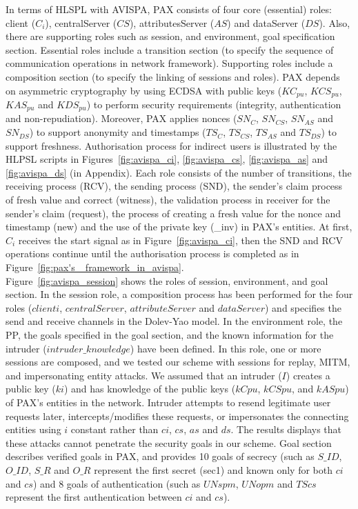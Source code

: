 \documentclass[journal,article,submit,moreauthors,pdftex]{Definitions/mdpi}
\begin{document}
\begin{itemize}
In terms of HLSPL with AVISPA, PAX consists of four core (essential) roles: client ($C_i$), centralServer ($CS$), attributesServer ($AS$) and dataServer ($DS$). Also, there are supporting roles such as session, and environment, goal specification section. Essential roles include a transition section (to specify the sequence of communication operations in network framework). Supporting roles include a composition section (to specify the linking of sessions and roles). PAX depends on asymmetric cryptography by using ECDSA with public keys ($KC_{pu}$, $KCS_{pu}$, $KAS_{pu}$ and $KDS_{pu}$) to perform security requirements (integrity, authentication and non-repudiation). Moreover, PAX applies nonces ($SN_C$, $SN_{CS}$, $SN_{AS}$ and $SN_{DS}$) to support anonymity and timestamps ($TS_{C}$, $TS_{CS}$, $TS_{AS}$ and $TS_{DS}$) to support freshness. Authorisation process for indirect users is illustrated by the HLPSL scripts in Figures~\ref{fig:avispa_ci}, \ref{fig:avispa_cs}, \ref{fig:avispa_as} and \ref{fig:avispa_ds} (in Appendix). Each role consists of the number of transitions, the receiving process (RCV), the sending process (SND), the sender's claim process of fresh value and correct (witness), the validation process in receiver for the sender's claim (request), the process of creating a fresh value for the nonce and timestamp (new) and the use of the private key (\_inv) in PAX's entities.
At first, $C_i$ receives the start signal as in Figure~\ref{fig:avispa_ci}, then the SND and RCV operations continue until the authorisation process is completed as in Figure~\ref{fig:pax's _framework_in_avispa}.\\
Figure~\ref{fig:avispa_session} shows the roles of session, environment, and goal section. In the session role, a composition process has been performed for the four roles ($clienti$, $centralServer$, $attributeServer$ and $dataServer$) and specifies the send and receive channels in the Dolev-Yao model. In the environment role, the PP, the goals specified in the goal section, and the known information for the intruder ($intruder\_knowledge$) have been defined.  In this role, one or more sessions are composed, and we tested our scheme with sessions for replay, MITM, and impersonating entity attacks. We assumed that an intruder ($I$) creates a public key ($ki$) and has knowledge of the public keys ($kCpu$, $kCSpu$, and $kASpu$) of PAX's entities in the network. Intruder attempts to resend legitimate user requests later, intercepts/modifies these requests, or impersonates the connecting entities using $i$ constant rather than $ci$, $cs$, $as$ and $ds$. The results displays that these attacks cannot penetrate the security goals in our scheme. Goal section describes verified goals in PAX, and provides 10 goals of secrecy (such as $S\_ID$, $O\_ID$, $S\_R$ and $O\_R$ represent the first secret (sec1) and known only for both $ci$ and $cs$) and 8 goals of authentication (such as $UNspm$, $UNopm$ and $TScs$ represent the first authentication between $ci$ and $cs$).

\end{itemize}
\end{document}
